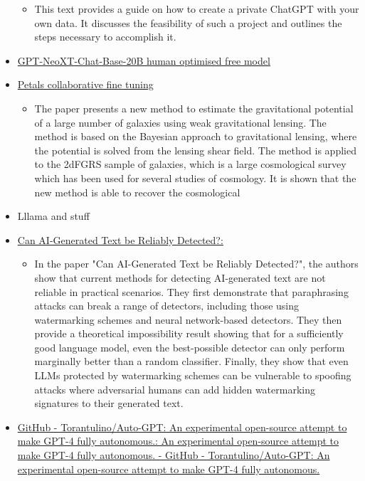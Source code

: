 \begin{itemize}
  \begin{itemize}
  \tightlist
  \item
    This text provides a guide on how to create a private ChatGPT with
    your own data. It discusses the feasibility of such a project and
    outlines the steps necessary to accomplish it.
  \end{itemize}
\item
  \href{https://huggingface.co/togethercomputer/GPT-NeoXT-Chat-Base-20B}{GPT-NeoXT-Chat-Base-20B
  human optimised free model}
\item
  \href{https://arxiv.org/abs/2209.01188}{Petals collaborative fine
  tuning}

  \begin{itemize}
  \tightlist
  \item
    The paper presents a new method to estimate the gravitational
    potential of a large number of galaxies using weak gravitational
    lensing. The method is based on the Bayesian approach to
    gravitational lensing, where the potential is solved from the
    lensing shear field. The method is applied to the 2dFGRS sample of
    galaxies, which is a large cosmological survey which has been used
    for several studies of cosmology. It is shown that the new method is
    able to recover the cosmological
  \end{itemize}
\item
  Lllama and stuff
\item
  \href{https://arxiv.org/abs/2303.11156}{Can AI-Generated Text be
  Reliably Detected?:}

  \begin{itemize}
  \tightlist
  \item
    In the paper "Can AI-Generated Text be Reliably Detected?", the
    authors show that current methods for detecting AI-generated text
    are not reliable in practical scenarios. They first demonstrate that
    paraphrasing attacks can break a range of detectors, including those
    using watermarking schemes and neural network-based detectors. They
    then provide a theoretical impossibility result showing that for a
    sufficiently good language model, even the best-possible detector
    can only perform marginally better than a random classifier.
    Finally, they show that even LLMs protected by watermarking schemes
    can be vulnerable to spoofing attacks where adversarial humans can
    add hidden watermarking signatures to their generated text.
  \end{itemize}
\item
  \href{https://github.com/Torantulino/Auto-GPT}{GitHub -
  Torantulino/Auto-GPT: An experimental open-source attempt to make
  GPT-4 fully autonomous.: An experimental open-source attempt to make
  GPT-4 fully autonomous. - GitHub - Torantulino/Auto-GPT: An
  experimental open-source attempt to make GPT-4 fully autonomous.}


\end{itemize}
